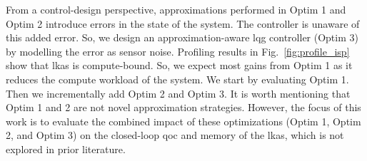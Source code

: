 \par From a control-design perspective, approximations performed in Optim 1 and Optim 2 introduce errors in the state of the system. The controller is unaware of this added error. So, we design an approximation-aware \gls{lqg} controller (Optim 3) by modelling the error as sensor noise. Profiling results in Fig.~\ref{fig:profile_isp} show that \gls{lkas} is compute-bound. So, we expect most gains from Optim 1 as it reduces the compute workload of the system.  We start by evaluating Optim 1. Then we incrementally add Optim 2 and Optim 3. It is worth mentioning that Optim 1 and 2 are not novel approximation strategies. However, the focus of this work is to evaluate the combined impact of these optimizations (Optim 1, Optim 2, and Optim 3) on the closed-loop \gls{qoc} and memory of the \gls{lkas}, which is not explored in prior literature.

